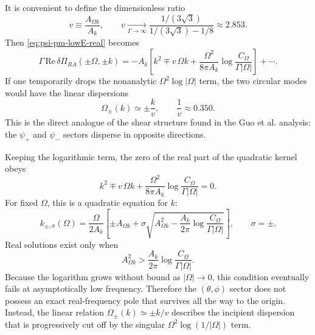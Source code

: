 \documentclass[aps,prx,preprint,amsmath,amssymb]{revtex4-2}
\renewcommand{\Re}{\text{Re}}
\begin{document}
It is convenient to define the dimensionless ratio
\begin{equation}\label{eq:v-theta-phi-def}
v\equiv \frac{A_{\Omega k}}{A_k},
\qquad
v\xrightarrow[\Gamma\to\infty]{}
\frac{1/(3\sqrt3)}{1/(3\sqrt3)-1/8}
\approx 2.853.
\end{equation}
Then \eqref{eq:psi-pm-lowE-real} becomes
\begin{equation}\label{eq:psi-pm-lowE-real-v}
\Gamma\,\Re\,\delta\Pi_{RA}(\pm\Omega,\pm k)
=
-A_k
\left[
k^2\mp v\,\Omega k
+\frac{\Omega^2}{8\pi A_k}\log\!\frac{C_\Omega}{\Gamma|\Omega|}
\right]
+\cdots.
\end{equation}
If one temporarily drops the nonanalytic \(\Omega^2\log|\Omega|\) term, the
two circular modes would have the linear dispersions
\begin{equation}\label{eq:linear-dispersion-theta-phi}
\Omega_\pm(k)\simeq \pm \frac{k}{v},
\qquad
\frac{1}{v}\approx 0.350.
\end{equation}
This is the direct analogue of the shear structure found in the Guo et al.
analysis: the \(\psi_+\) and \(\psi_-\) sectors disperse in opposite
directions.

Keeping the logarithmic term, the zero of the real part of the quadratic kernel
obeys
\begin{equation}\label{eq:dispersion-equation-theta-phi}
k^2\mp v\,\Omega k
+\frac{\Omega^2}{8\pi A_k}\log\!\frac{C_\Omega}{\Gamma|\Omega|}
=0.
\end{equation}
For fixed \(\Omega\), this is a quadratic equation for \(k\):
\begin{equation}\label{eq:k-of-omega-theta-phi}
k_{\pm,\sigma}(\Omega)
=
\frac{\Omega}{2A_k}
\left[
\pm A_{\Omega k}
+\sigma\sqrt{
A_{\Omega k}^2
-\frac{A_k}{2\pi}\log\!\frac{C_\Omega}{\Gamma|\Omega|}
}
\right],
\qquad
\sigma=\pm.
\end{equation}
Real solutions exist only when
\begin{equation}\label{eq:discriminant-theta-phi}
A_{\Omega k}^2
>
\frac{A_k}{2\pi}\log\!\frac{C_\Omega}{\Gamma|\Omega|}.
\end{equation}
Because the logarithm grows without bound as \(|\Omega|\to 0\), this condition
eventually fails at asymptotically low frequency.  Therefore the
\((\theta,\phi)\) sector does not possess an exact real-frequency pole that
survives all the way to the origin.  Instead, the linear relation
\(\Omega_\pm(k)\simeq \pm k/v\) describes the incipient dispersion that is
progressively cut off by the singular \(\Omega^2\log(1/|\Omega|)\) term.
\end{document}
